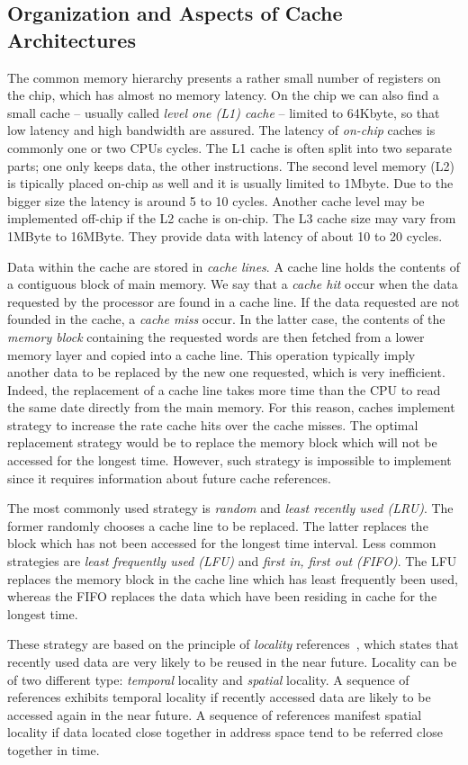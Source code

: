 \subsection{Organization and Aspects of Cache Architectures}
The common memory hierarchy presents a rather small number of registers on the chip, which has almost no memory latency. On the chip we can also find a small cache -- usually called \textit{level one (L1) cache} -- limited to 64Kbyte, so that low latency and high bandwidth are assured. The latency of \textit{on-chip} caches is commonly one or two CPUs cycles. The L1 cache is often split into two separate parts; one only keeps data, the other instructions. The second level memory (L2) is tipically placed on-chip as well and it is usually limited to 1Mbyte. Due to the bigger size the  latency is around 5 to 10 cycles. Another cache level may be implemented off-chip if the L2 cache is on-chip. The L3 cache size may vary from 1MByte to 16MByte. They provide data with latency of about 10 to 20 cycles.

Data within the cache are stored in \textit{cache lines}. A cache line holds the contents of a contiguous block of main memory. We say that a \textit{cache hit} occur when the data requested by the processor are found in a cache line. If the data requested are not founded in the cache, a \textit{cache miss} occur. In the latter case, the contents of the \textit{memory block} containing the requested words are then fetched from a lower memory layer and copied into a cache line. This operation typically imply another data to be replaced by the new one requested, which is very inefficient. Indeed, the replacement of a cache line takes more time than the CPU to read the same date directly from the main memory. For this reason, caches implement strategy to increase the rate cache hits  over the cache misses. The optimal replacement strategy would be to replace the memory block which will not be accessed for the longest time. However, such strategy is impossible to implement since it requires information about future cache references. 

The most commonly used strategy is \textit{random} and \textit{least recently used (LRU)}. The former randomly chooses a cache line to be replaced. The latter replaces the block which has not been accessed for the longest time interval. Less common strategies are \textit{least frequently used (LFU)} and \textit{first in, first out (FIFO)}. The LFU replaces the memory block in the cache line which has least frequently been used, whereas the FIFO replaces the data which have been residing in cache for the longest time.

These strategy are based on the principle of \textit{locality} references~\cite{Hennessy-Patterson}, which states that recently used data are very likely to be reused in the near future. Locality can be of two different type: \textit{temporal} locality and \textit{spatial} locality. A sequence of references exhibits temporal locality if recently accessed data are likely to be accessed again in the near future. A sequence of references manifest spatial locality if data located close together in address space tend to be referred close together in time.
